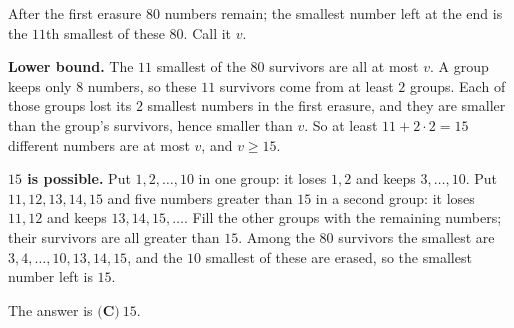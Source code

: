 After the first erasure $80$ numbers remain; the smallest number left at the end is the $11$th smallest of these $80$. Call it $v$.

\textbf{Lower bound.} The $11$ smallest of the $80$ survivors are all at most $v$. A group keeps only $8$ numbers, so these $11$ survivors come from at least $2$ groups. Each of those groups lost its $2$ smallest numbers in the first erasure, and they are smaller than the group's survivors, hence smaller than $v$. So at least $11+2\cdot2=15$ different numbers are at most $v$, and $v\ge15$.

\textbf{$15$ is possible.} Put $1,2,\dots,10$ in one group: it loses $1,2$ and keeps $3,\dots,10$. Put $11,12,13,14,15$ and five numbers greater than $15$ in a second group: it loses $11,12$ and keeps $13,14,15,\dots$. Fill the other groups with the remaining numbers; their survivors are all greater than $15$. Among the $80$ survivors the smallest are $3,4,\dots,10,13,14,15$, and the $10$ smallest of these are erased, so the smallest number left is $15$.

The answer is $\boxed{\textbf{(C)}\ 15}$.
